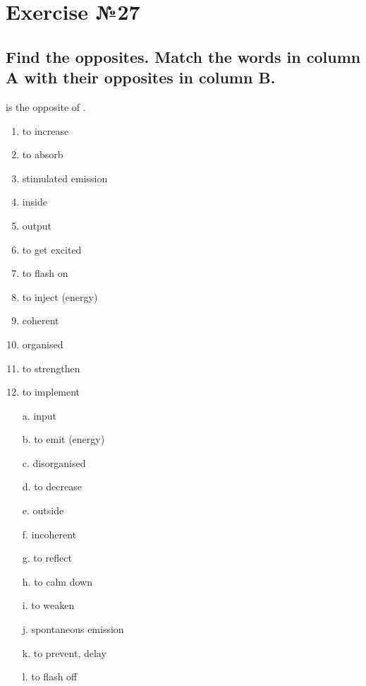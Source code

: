 \section{Exercise №27}
\subsection*{Find the opposites. Match the words in column A with their opposites in
      column B.}
 is the opposite of .

\begin{enumerate}
      \item to increase
      \item to absorb
      \item stimulated emission
      \item inside
      \item output
      \item to get excited
      \item to flash on
      \item to inject (energy)
      \item coherent
      \item organised
      \item to strengthen
      \item to implement \\
\end{enumerate}

\begin{enumerate}
      \item[a.] input
      \item[b.] to emit (energy)
      \item[c.] disorganised
      \item[d.] to decrease
      \item[e.] outside
      \item[f.] incoherent
      \item[g.] to reflect
      \item[h.] to calm down
      \item[i.] to weaken
      \item[j.] spontaneous emission
      \item[k.] to prevent, delay
      \item[l.] to flash off
\end{enumerate}

